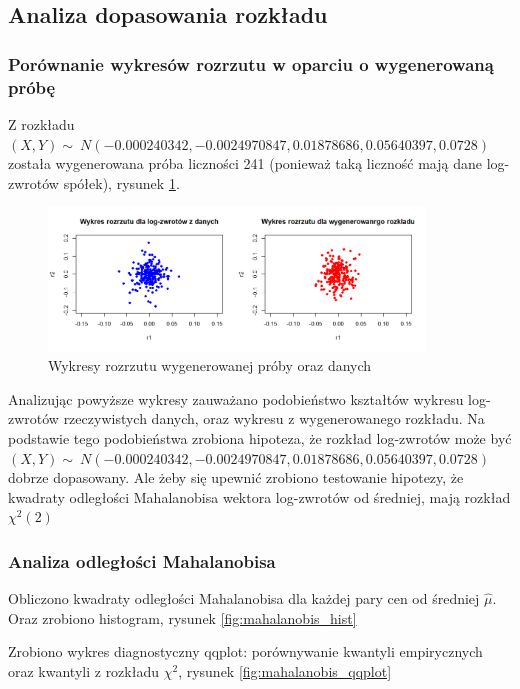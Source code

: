 \documentclass[a4paper,11pt]{article}
\begin{document}
\subsection{Analiza dopasowania rozkładu}
\subsubsection{Porównanie wykresów rozrzutu w oparciu o wygenerowaną próbę}
Z rozkładu $(X, Y) \sim\ N(-0.000240342, -0.0024970847, 0.01878686, 0.05640397, 0.0728)$ została wygenerowana próba liczności 241 (ponieważ taką liczność mają dane log-zwrotów spółek), rysunek \ref{fig:wykresy_rozrzutu}.
\begin{figure}[!htb]
	\centering
	\includegraphics[width=10cm]{wykres_rozrzutu_porownanie.png}
	\caption{Wykresy rozrzutu wygenerowanej próby oraz danych }
         \label{fig:wykresy_rozrzutu}
\end{figure}
Analizując powyższe wykresy zauważano podobieństwo kształtów wykresu log-zwrotów rzeczywistych danych, oraz wykresu z wygenerowanego rozkładu. Na podstawie tego podobieństwa zrobiona hipoteza, że rozkład log-zwrotów może być $(X, Y) \sim\ N(-0.000240342, -0.0024970847, 0.01878686, 0.05640397, 0.0728)$ dobrze dopasowany. Ale żeby się upewnić zrobiono testowanie hipotezy, że kwadraty odległości Mahalanobisa wektora log-zwrotów od średniej, mają rozkład $ \chi^2(2)$

\subsubsection{Analiza odległości Mahalanobisa}

Obliczono kwadraty odległości Mahalanobisa dla każdej pary cen od średniej $ \hat{\mu} $. Oraz zrobiono histogram, rysunek \ref{fig:mahalanobis_hist}

Zrobiono wykres diagnostyczny qqplot: porównywanie kwantyli empirycznych oraz kwantyli z rozkładu $ \chi^2$, rysunek \ref{fig:mahalanobis_qqplot}
\end{document}
